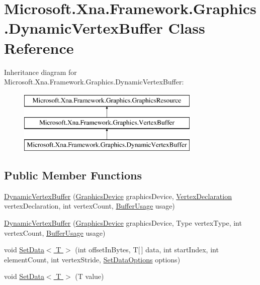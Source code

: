\hypertarget{class_microsoft_1_1_xna_1_1_framework_1_1_graphics_1_1_dynamic_vertex_buffer}{}\section{Microsoft.\+Xna.\+Framework.\+Graphics.\+Dynamic\+Vertex\+Buffer Class Reference}
\label{class_microsoft_1_1_xna_1_1_framework_1_1_graphics_1_1_dynamic_vertex_buffer}
Inheritance diagram for Microsoft.\+Xna.\+Framework.\+Graphics.\+Dynamic\+Vertex\+Buffer\+:\begin{figure}[H]
\begin{center}
\leavevmode
\includegraphics[height=3.000000cm]{class_microsoft_1_1_xna_1_1_framework_1_1_graphics_1_1_dynamic_vertex_buffer}
\end{center}
\end{figure}
\subsection*{Public Member Functions}
\begin{DoxyCompactItemize}
\item 
\hyperlink{class_microsoft_1_1_xna_1_1_framework_1_1_graphics_1_1_dynamic_vertex_buffer_a237ba1854b9728b77149ba86dd71075f}{Dynamic\+Vertex\+Buffer} (\hyperlink{class_microsoft_1_1_xna_1_1_framework_1_1_graphics_1_1_graphics_device}{Graphics\+Device} graphics\+Device, \hyperlink{class_microsoft_1_1_xna_1_1_framework_1_1_graphics_1_1_vertex_declaration}{Vertex\+Declaration} vertex\+Declaration, int vertex\+Count, \hyperlink{namespace_microsoft_1_1_xna_1_1_framework_1_1_graphics_a8ccf7bb06c26840f01836a64d983367b}{Buffer\+Usage} usage)
\item 
\hyperlink{class_microsoft_1_1_xna_1_1_framework_1_1_graphics_1_1_dynamic_vertex_buffer_aef20d5c46464ebe2e3520303520a8140}{Dynamic\+Vertex\+Buffer} (\hyperlink{class_microsoft_1_1_xna_1_1_framework_1_1_graphics_1_1_graphics_device}{Graphics\+Device} graphics\+Device, Type vertex\+Type, int vertex\+Count, \hyperlink{namespace_microsoft_1_1_xna_1_1_framework_1_1_graphics_a8ccf7bb06c26840f01836a64d983367b}{Buffer\+Usage} usage)
\item 
void \hyperlink{class_microsoft_1_1_xna_1_1_framework_1_1_graphics_1_1_dynamic_vertex_buffer_a6daa18c41f1992730c6fa1f57bcd80c7}{Set\+Data$<$ T $>$} (int offset\+In\+Bytes, T\mbox{[}$\,$\mbox{]} data, int start\+Index, int element\+Count, int vertex\+Stride, \hyperlink{namespace_microsoft_1_1_xna_1_1_framework_1_1_graphics_a6d10764187628d4af59698fed690e124}{Set\+Data\+Options} options)
\item 
void \hyperlink{class_microsoft_1_1_xna_1_1_framework_1_1_graphics_1_1_dynamic_vertex_buffer_a288de0d6c6d24bdcf7a378ad43055d6a}{Set\+Data$<$ T $>$} (T value)
\end{DoxyCompactItemize}

